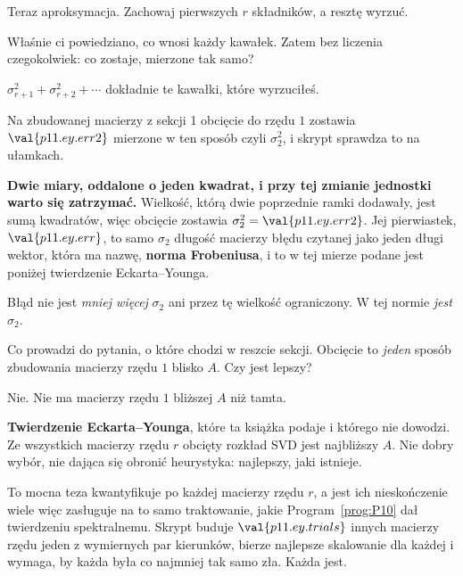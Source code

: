 
\begin{fr}
Teraz aproksymacja. Zachowaj pierwszych $r$ składników, a resztę wyrzuć.

Właśnie ci powiedziano, co wnosi każdy kawałek. Zatem bez liczenia czegokolwiek:
co zostaje, mierzone tak samo?
\dotline
\nextframe
\end{fr}

\begin{fr}
\begin{ansblock}
$\sigma_{r+1}^{2} + \sigma_{r+2}^{2} + \cdots$ \dash{} dokładnie te kawałki,
które wyrzuciłeś.
\end{ansblock}

Na zbudowanej macierzy z sekcji 1 obcięcie do rzędu $1$ zostawia
$\val{p11.ey.err2}$ mierzone w ten sposób \dash{} czyli $\sigma_2^{2}$, i
skrypt sprawdza to na ułamkach.

\textbf{Dwie miary, oddalone o jeden kwadrat, i przy tej zmianie jednostki
warto się zatrzymać.} Wielkość, którą dwie poprzednie ramki dodawały, jest sumą
kwadratów, więc obcięcie zostawia $\sigma_2^{2} = \val{p11.ey.err2}$. Jej
pierwiastek, $\val{p11.ey.err}$, to samo $\sigma_2$ \dash{} długość macierzy
błędu czytanej jako jeden długi wektor, która ma nazwę, \textbf{norma
Frobeniusa}, i to w tej mierze podane jest poniżej twierdzenie
Eckarta--Younga.

Błąd nie jest \emph{mniej więcej} $\sigma_2$ ani przez tę wielkość
ograniczony. W tej normie \emph{jest} $\sigma_2$.

Co prowadzi do pytania, o które chodzi w reszcie sekcji. Obcięcie to
\emph{jeden} sposób zbudowania macierzy rzędu $1$ blisko $A$. Czy jest lepszy?
\dotline
\nextframe
\end{fr}

\begin{fr}
\begin{ansblock}
Nie. Nie ma macierzy rzędu $1$ bliższej $A$ niż tamta.
\end{ansblock}

\textbf{Twierdzenie Eckarta--Younga}, które ta książka podaje i którego nie
dowodzi. Ze wszystkich macierzy rzędu $r$ obcięty rozkład SVD jest najbliższy
$A$. Nie dobry wybór, nie dająca się obronić heurystyka: najlepszy, jaki
istnieje.

To mocna teza \dash{} kwantyfikuje po każdej macierzy rzędu $r$, a jest ich
nieskończenie wiele \dash{} więc zasługuje na to samo traktowanie, jakie
Program~\ref{prog:P10} dał twierdzeniu spektralnemu. Skrypt buduje
$\val{p11.ey.trials}$ innych macierzy rzędu jeden z wymiernych par kierunków,
bierze najlepsze skalowanie dla każdej i wymaga, by każda była co najmniej tak
samo zła. Każda jest.
\end{fr}

